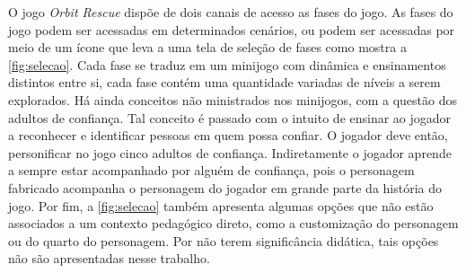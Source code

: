 \vspace{-0.3cm}


O jogo \textit{Orbit Rescue} dispõe de dois canais de acesso as fases do jogo. As fases do jogo podem ser acessadas em determinados cenários, ou podem ser acessadas por meio de um ícone que leva a uma tela de seleção de fases como mostra a \autoref{fig:selecao}. Cada fase se traduz em um minijogo com dinâmica e ensinamentos distintos entre si, cada fase contém uma quantidade variadas de níveis a serem explorados. Há ainda conceitos não ministrados nos minijogos, com a questão dos adultos de confiança. Tal conceito é passado com o intuito de ensinar ao jogador a reconhecer e identificar pessoas em quem possa confiar. O jogador deve então, personificar no jogo cinco adultos de confiança. Indiretamente o jogador aprende a sempre estar acompanhado por alguém de confiança, pois o personagem fabricado acompanha o personagem do jogador em grande parte da história do jogo. Por fim, a \autoref{fig:selecao} também apresenta algumas opções que não estão associados a um contexto pedagógico direto, como a customização do personagem ou do quarto do personagem. Por não terem significância didática, tais opções não são apresentadas nesse trabalho. 


